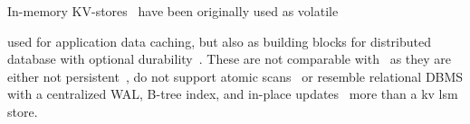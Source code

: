 
In-memory KV-stores~\cite{ignite, redis, memcached, aerospike} have been originally used as volatile 

used for application data caching, but also as building blocks for distributed database with optional durability~\cite{ignite,redis}. These are not comparable with \sys\ as they are either not persistent~\cite{memcached}, do not support atomic scans~\cite{redis} or resemble  relational DBMS with a centralized WAL, B-tree index, and in-place updates~\cite{ignite}  more than a kv lsm store.